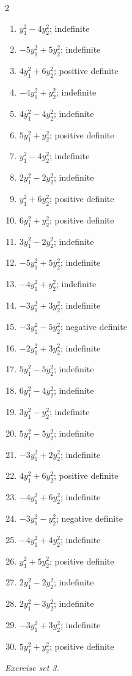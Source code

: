 \begin{multicols}{2}\raggedright
\begin{enumerate}[label=\arabic*., leftmargin=*, itemsep=1pt]
\item $y_1^2-4y_2^2$; indefinite
\item $-5y_1^2+5y_2^2$; indefinite
\item $4y_1^2+6y_2^2$; positive definite
\item $-4y_1^2+y_2^2$; indefinite
\item $4y_1^2-4y_2^2$; indefinite
\item $5y_1^2+y_2^2$; positive definite
\item $y_1^2-4y_2^2$; indefinite
\item $2y_1^2-2y_2^2$; indefinite
\item $y_1^2+6y_2^2$; positive definite
\item $6y_1^2+y_2^2$; positive definite
\item $3y_1^2-2y_2^2$; indefinite
\item $-5y_1^2+5y_2^2$; indefinite
\item $-4y_1^2+y_2^2$; indefinite
\item $-3y_1^2+3y_2^2$; indefinite
\item $-3y_1^2-5y_2^2$; negative definite
\item $-2y_1^2+3y_2^2$; indefinite
\item $5y_1^2-5y_2^2$; indefinite
\item $6y_1^2-4y_2^2$; indefinite
\item $3y_1^2-y_2^2$; indefinite
\item $5y_1^2-5y_2^2$; indefinite
\item $-3y_1^2+2y_2^2$; indefinite
\item $4y_1^2+6y_2^2$; positive definite
\item $-4y_1^2+6y_2^2$; indefinite
\item $-3y_1^2-y_2^2$; negative definite
\item $-4y_1^2+4y_2^2$; indefinite
\item $y_1^2+5y_2^2$; positive definite
\item $2y_1^2-2y_2^2$; indefinite
\item $2y_1^2-3y_2^2$; indefinite
\item $-3y_1^2+3y_2^2$; indefinite
\item $5y_1^2+y_2^2$; positive definite
\end{enumerate}
\end{multicols}
\par\noindent\emph{Exercise set 3.}\nopagebreak
